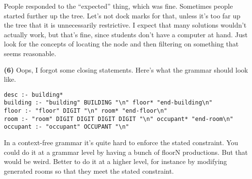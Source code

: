 \documentclass[11pt,onecolumn,letterpaper]{article}
\newcounter{qNum}
\newcommand{\q}[1]{%
\textbf{(#1)}\stepcounter{qNum}}
\begin{document}
People responded to the ``expected'' thing, which was fine. Sometimes people started
further up the tree. Let's not dock marks for that, unless it's too far up the tree that
it is unnecessarily restrictive. I expect that many solutions wouldn't actually work, but that's
fine, since students don't have a computer at hand. Just look for the concepts of locating the node and
then filtering on something that seems reasonable.

\q{6} Oops, I forgot some closing statements. Here's what the grammar should look like.

\begin{verbatim}
desc :- building*
building :- "building" BUILDING "\n" floor* "end-building\n"
floor :- "floor" DIGIT "\n" room* "end-floor\n"
room :- "room" DIGIT DIGIT DIGIT DIGIT "\n" occupant* "end-room\n"
occupant :- "occupant" OCCUPANT "\n"
\end{verbatim}

In a context-free grammar it's quite hard to enforce the stated constraint. You could do it at a
grammar level by having a bunch of floorN productions. But that would be weird. Better to do it at a
higher level, for instance by modifying generated rooms so that they meet the stated constraint.
\end{document}
